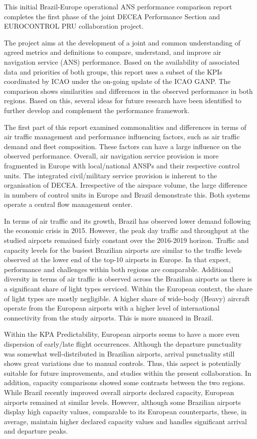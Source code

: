 \documentclass[
]{book}
\begin{document}
This initial Brazil-Europe operational ANS performance comparison report completes the first phase of the joint DECEA Performance Section and EUROCONTROL PRU collaboration project.

The project aims at the development of a joint and common understanding of agreed metrics and definitions to compare, understand, and improve air navigation service (ANS) performance. Based on the availability of associated data and priorities of both groups, this report uses a subset of the KPIs coordinated by ICAO under the on-going update of the ICAO GANP.
The comparison shows similarities and differences in the observed performance in both regions.
Based on this, several ideas for future research have been identified to further develop and complement the performance framework.

The first part of this report examined commonalities and differences in terms of air traffic management and performance influencing factors, such as air traffic demand and fleet composition. These factors can have a large influence on the observed performance. Overall, air navigation service provision is more fragmented in Europe with local/national ANSPs and their respective control units. The integrated civil/military service provision is inherent to the organisation of DECEA. Irrespective of the airspace volume, the large difference in numbers of control units in Europe and Brazil demonstrate this. Both systems operate a central flow management center.

In terms of air traffic and its growth, Brazil has observed lower demand following the economic crisis in 2015.
However, the peak day traffic and throughput at the studied airports remained fairly constant over the 2016-2019 horizon.
Traffic and capacity levels for the busiest Brazilian airports are similar to the traffic levels observed at the lower end of the top-10 airports in Europe.
In that expect, performance and challenges within both regions are comparable.
Additional diversity in terms of air traffic is observed across the Brazilian airports as there is a significant share of light types serviced. Within the European context, the share of light types are mostly negligible. A higher share of wide-body (Heavy) aircraft operate from the European airports with a higher level of international connectivity from the study airports.
This is more nuanced in Brazil.

Within the KPA Predictability, European airports seems to have a more even dispersion of early/late flight occurrences. Although the departure punctuality was somewhat well-distributed in Brazilian airports, arrival punctuality still shows great variations due to manual controls. Thus, this aspect is potentially suitable for future improvements, and studies within the present collaboration.
In addition, capacity comparisons showed some contrasts between the two regions. While Brazil recently improved overall airports declared capacity, European airports remained at similar levels. However, although some Brazilian airports display high capacity values, comparable to its European counterparts, these, in average, maintain higher declared capacity values and handles significant arrival and departure peaks.
\end{document}
